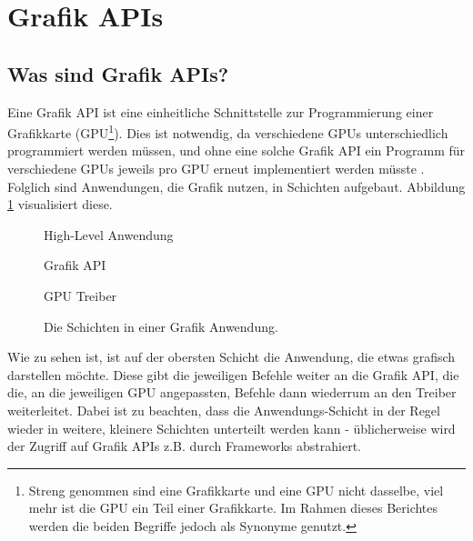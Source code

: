 
\section{Grafik APIs}

\subsection{Was sind Grafik APIs?}
Eine Grafik API ist eine einheitliche Schnittstelle zur Programmierung einer Grafikkarte (GPU\footnote{Streng genommen sind eine Grafikkarte und eine GPU nicht dasselbe, viel mehr ist die GPU ein Teil einer Grafikkarte. Im Rahmen dieses Berichtes werden die beiden Begriffe jedoch als Synonyme genutzt.}). Dies ist notwendig, da verschiedene GPUs unterschiedlich programmiert werden müssen, und ohne eine solche Grafik API ein Programm für verschiedene GPUs jeweils pro GPU erneut implementiert werden müsste \cite{samsung_what_is_a_graphics_api}. Folglich sind Anwendungen, die Grafik nutzen, in Schichten aufgebaut. Abbildung \ref{fig:applicationlayers} visualisiert diese.

\begin{figure}
    \caption{Die Schichten in einer Grafik Anwendung.}
    \label{fig:applicationlayers}
    \begin{tcolorbox}
        \begin{tcolorbox}
            \begin{center}
                High-Level Anwendung
            \end{center}
        \end{tcolorbox}
        \begin{tcolorbox}
            \begin{center}
                Grafik API
            \end{center}
        \end{tcolorbox}
        \begin{tcolorbox}
            \begin{center}
                GPU Treiber
            \end{center}
        \end{tcolorbox}
    \end{tcolorbox}
\end{figure}

Wie zu sehen ist, ist auf der obersten Schicht die Anwendung, die etwas grafisch darstellen möchte. Diese gibt die jeweiligen Befehle weiter an die Grafik API, die die, an die jeweiligen GPU angepassten, Befehle dann wiederrum an den Treiber weiterleitet. Dabei ist zu beachten, dass die Anwendungs-Schicht in der Regel wieder in weitere, kleinere Schichten unterteilt werden kann - üblicherweise wird der Zugriff auf Grafik APIs z.B. durch Frameworks abstrahiert.

